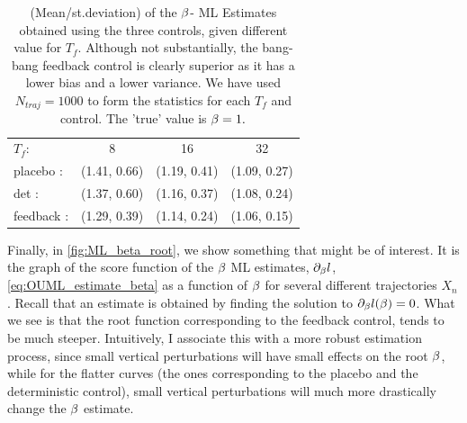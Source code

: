 \begin{table}
\begin{tabular}{l|ccc}
$T_f$:
 & 8
 & 16
 & 32
\\
placebo :
 & (1.41, 0.66)
 & (1.19, 0.41)
 & (1.09, 0.27)
\\
det :
 & (1.37, 0.60)
 & (1.16, 0.37)
 & (1.08, 0.24)
\\
feedback :
 & (1.29, 0.39)
 & (1.14, 0.24)
 & (1.06, 0.15)
\\
\end{tabular}
\caption{(Mean/st.deviation) of the $\beta$- ML Estimates obtained using the three
controls, given different value for $T_f$. Although not substantially, the
bang-bang feedback control is clearly superior as it has a lower bias and a
lower variance. We have used $N_{traj} = 1000$ to form the statistics for each
$T_f$ and control. The 'true' value is $\beta = 1.$}
\label{tab:OU_control_estimates_bang_bang_time_vs_space}
\end{table}


Finally, in \cref{fig:ML_beta_root}, we show something that might be of
interest. It is the graph of the score function of the $\beta$ ML estimates,
${\partial}_\beta l$, \cref{eq:OUML_estimate_beta} as a function of $\beta$ for several
different trajectories ${X_n}$. Recall that an estimate is obtained by finding
the solution to ${\partial}_\beta l(\beta) = 0$. What we see is that the
root function corresponding to the feedback control, tends to be much steeper. Intuitively, I associate this
with a more robust estimation process, since small vertical perturbations will
have small effects on the root $\beta$, while for the flatter curves (the ones
corresponding to the placebo and the deterministic control), small vertical
perturbations will much more drastically change the $\beta$ estimate.
 
